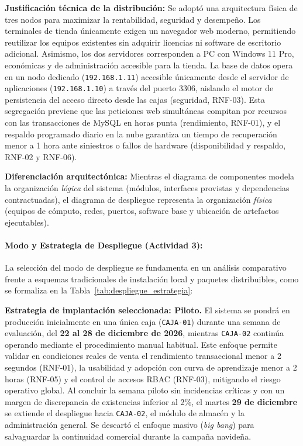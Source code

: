 \documentclass[12pt,a4paper]{article}
\begin{document}
\textbf{Justificación técnica de la distribución:} Se adoptó una arquitectura física de tres nodos para maximizar la rentabilidad, seguridad y desempeño. Los terminales de tienda únicamente exigen un navegador web moderno, permitiendo reutilizar los equipos existentes sin adquirir licencias ni software de escritorio adicional. Asimismo, los dos servidores corresponden a PC con Windows 11 Pro, económicas y de administración accesible para la tienda. La base de datos opera en un nodo dedicado (\texttt{192.168.1.11}) accesible únicamente desde el servidor de aplicaciones (\texttt{192.168.1.10}) a través del puerto 3306, aislando el motor de persistencia del acceso directo desde las cajas (seguridad, RNF-03). Esta segregación previene que las peticiones web simultáneas compitan por recursos con las transacciones de MySQL en horas punta (rendimiento, RNF-01), y el respaldo programado diario en la nube garantiza un tiempo de recuperación menor a 1 hora ante siniestros o fallos de hardware (disponibilidad y respaldo, RNF-02 y RNF-06).

\textbf{Diferenciación arquitectónica:} Mientras el diagrama de componentes modela la organización \emph{lógica} del sistema (módulos, interfaces provistas y dependencias contractuadas), el diagrama de despliegue representa la organización \emph{física} (equipos de cómputo, redes, puertos, software base y ubicación de artefactos ejecutables).

\paragraph{Modo y Estrategia de Despliegue (Actividad 3):}
La selección del modo de despliegue se fundamenta en un análisis comparativo frente a esquemas tradicionales de instalación local y paquetes distribuibles, como se formaliza en la Tabla~\ref{tab:despliegue_estrategia}:



\textbf{Estrategia de implantación seleccionada: Piloto.} El sistema se pondrá en producción inicialmente en una única caja (\texttt{CAJA-01}) durante una semana de evaluación, del \textbf{22 al 28 de diciembre de 2026}, mientras \texttt{CAJA-02} continúa operando mediante el procedimiento manual habitual. Este enfoque permite validar en condiciones reales de venta el rendimiento transaccional menor a 2 segundos (RNF-01), la usabilidad y adopción con curva de aprendizaje menor a 2 horas (RNF-05) y el control de accesos RBAC (RNF-03), mitigando el riesgo operativo global. Al concluir la semana piloto sin incidencias críticas y con un margen de discrepancia de existencias inferior al 2\%, el martes \textbf{29 de diciembre} se extiende el despliegue hacia \texttt{CAJA-02}, el módulo de almacén y la administración general. Se descartó el enfoque masivo (\emph{big bang}) para salvaguardar la continuidad comercial durante la campaña navideña.
\end{document}
